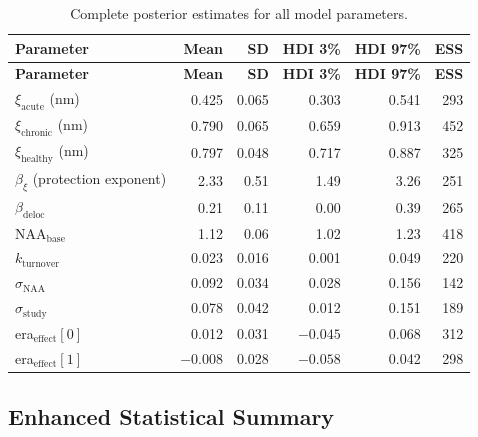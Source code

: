 \documentclass[11pt]{article}
\begin{document}
\begin{longtable}{lrrrrr}
\caption{Complete posterior estimates for all model parameters.} \\
\toprule
\textbf{Parameter} & \textbf{Mean} & \textbf{SD} & \textbf{HDI 3\%} & \textbf{HDI 97\%} & \textbf{ESS} \\
\midrule
\endfirsthead
\toprule
\textbf{Parameter} & \textbf{Mean} & \textbf{SD} & \textbf{HDI 3\%} & \textbf{HDI 97\%} & \textbf{ESS} \\
\midrule
\endhead
\bottomrule
\endlastfoot
$\xi_\text{acute}$ (nm) & 0.425 & 0.065 & 0.303 & 0.541 & 293 \\
$\xi_\text{chronic}$ (nm) & 0.790 & 0.065 & 0.659 & 0.913 & 452 \\
$\xi_\text{healthy}$ (nm) & 0.797 & 0.048 & 0.717 & 0.887 & 325 \\
$\beta_\xi$ (protection exponent) & 2.33 & 0.51 & 1.49 & 3.26 & 251 \\
$\beta_\text{deloc}$ & 0.21 & 0.11 & 0.00 & 0.39 & 265 \\
NAA$_\text{base}$ & 1.12 & 0.06 & 1.02 & 1.23 & 418 \\
$k_\text{turnover}$ & 0.023 & 0.016 & 0.001 & 0.049 & 220 \\
$\sigma_\text{NAA}$ & 0.092 & 0.034 & 0.028 & 0.156 & 142 \\
$\sigma_\text{study}$ & 0.078 & 0.042 & 0.012 & 0.151 & 189 \\
era$_\text{effect}[0]$ & 0.012 & 0.031 & $-0.045$ & 0.068 & 312 \\
era$_\text{effect}[1]$ & $-0.008$ & 0.028 & $-0.058$ & 0.042 & 298 \\
\end{longtable}

\subsection{Enhanced Statistical Summary}
\end{document}
